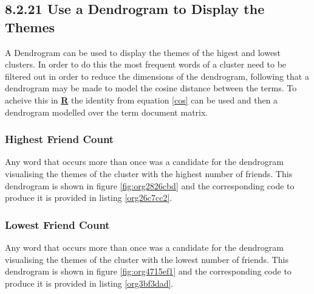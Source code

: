 \documentclass[11pt]{article}
\begin{document}
\subsection{8.2.21 Use a Dendrogram to Display the Themes}
\label{sec:org25587d3}
A Dendrogram can be used to display the themes of the higest and lowest
clusters. In order to do this the most frequent words of a cluster need to be
filtered out in order to reduce the dimensions of the dendrogram, following that
a dendrogram may be made to model the cosine distance between the terms. To
acheive this in \textbf{\textbf{\uline{R}}} the identity from equation \eqref{cos} can be used and
then a dendrogram modelled over the term document matrix.


\subsubsection{Highest Friend Count}
\label{sec:org1f589b4}
Any word that occurs more than once was a candidate for the dendrogram visualising the themes of the cluster with the highest number of friends. This dendrogram is shown in figure \ref{fig:org2826cbd} and the corresponding code to produce it is provided in listing \ref{org26c7cc2}.

\subsubsection{Lowest Friend Count}
\label{sec:orga5a874a}
Any word that occurs more than once was a candidate for the dendrogram visualising the themes of the cluster with the lowest number of friends. This dendrogram is shown in figure \ref{fig:org4715ef1} and the corresponding code to produce it is provided in listing \ref{org3bf3dad}.
\end{document}
